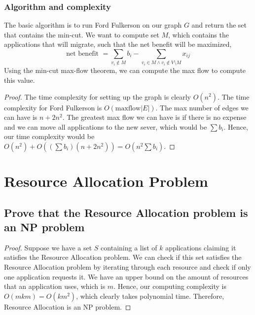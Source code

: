 \documentclass[11pt]{scrartcl}
\begin{document}
	\subsubsection{
		Algorithm and complexity
	}
	The basic algorithm is to run Ford Fulkerson on our graph $G$ and return the set that contains the min-cut. 
	We want to compute set $M$, which contains the applications that will migrate, such that the net benefit 
	will be maximized, 
	$$ 
	\text{net benefit } = \sum_{v_i \notin M} b_i - \sum_{v_i \in M \land v_i \notin V \setminus M}  x_{ij}
	$$
	Using the min-cut max-flow theorem, we can compute the max flow to compute this value. 
	\begin{proof}
		The time complexity for setting up the graph is clearly $O(n^2)$.
		The time complexity for Ford Fulkerson is $O(\text{maxflow}|E|)$. The max number of edges we can have
		is $n + 2n^2$. The greatest max flow we can have is if there is no expense and we can move all 
		applications to the new sever, which would be $\sum b_i$. Hence, our time complexity would be 
		$O(n^2) + O((\sum b_i)(n + 2n^2)) = O(n^2\sum b_i)$.
	\end{proof}


	\pagebreak




\section{
  Resource Allocation Problem
 }

\subsection{
	Prove that the Resource Allocation problem is an NP problem
}
\begin{proof}
	Suppose we have a set $S$ containing a list of $k$ applications claiming it satisfies the Resource Allocation problem.
	We can check if this set satisfies the Resource Allocation problem by iterating through each resource and check if 
	only one application requests it. We have an upper bound on the amount of resources that an application
	uses, which is $m$.  Hence, our computing complexity is $O(mkm) = O(km^2)$, which clearly takes polynomial time.
	Therefore, Resource Allocation is an NP problem.
\end{proof}
\end{document}
